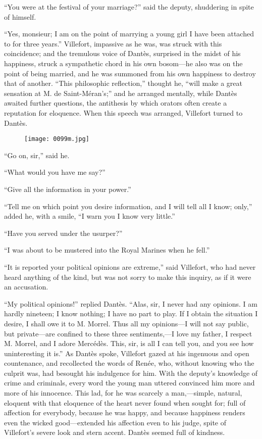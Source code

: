 “You were at the festival of your marriage?” said the deputy,
shuddering in spite of himself.

“Yes, monsieur; I am on the point of marrying a young girl I have been
attached to for three years.” Villefort, impassive as he was, was
struck with this coincidence; and the tremulous voice of Dantès,
surprised in the midst of his happiness, struck a sympathetic chord in
his own bosom—he also was on the point of being married, and he was
summoned from his own happiness to destroy that of another. “This
philosophic reflection,” thought he, “will make a great sensation at M.
de Saint-Méran’s;” and he arranged mentally, while Dantès awaited
further questions, the antithesis by which orators often create a
reputation for eloquence. When this speech was arranged, Villefort
turned to Dantès.

\begin{figure}[h]
\texttt{[image: 0099m.jpg]}
\end{figure}

“Go on, sir,” said he.

“What would you have me say?”

“Give all the information in your power.”

“Tell me on which point you desire information, and I will tell all I
know; only,” added he, with a smile, “I warn you I know very little.”

“Have you served under the usurper?”

“I was about to be mustered into the Royal Marines when he fell.”

“It is reported your political opinions are extreme,” said Villefort,
who had never heard anything of the kind, but was not sorry to make
this inquiry, as if it were an accusation.

“My political opinions!” replied Dantès. “Alas, sir, I never had any
opinions. I am hardly nineteen; I know nothing; I have no part to play.
If I obtain the situation I desire, I shall owe it to M. Morrel. Thus
all my opinions—I will not say public, but private—are confined to
these three sentiments,—I love my father, I respect M. Morrel, and I
adore Mercédès. This, sir, is all I can tell you, and you see how
uninteresting it is.” As Dantès spoke, Villefort gazed at his ingenuous
and open countenance, and recollected the words of Renée, who, without
knowing who the culprit was, had besought his indulgence for him. With
the deputy’s knowledge of crime and criminals, every word the young man
uttered convinced him more and more of his innocence. This lad, for he
was scarcely a man,—simple, natural, eloquent with that eloquence of
the heart never found when sought for; full of affection for everybody,
because he was happy, and because happiness renders even the wicked
good—extended his affection even to his judge, spite of Villefort’s
severe look and stern accent. Dantès seemed full of kindness.

